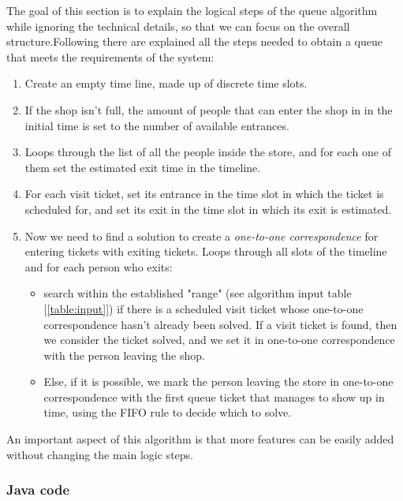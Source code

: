 The goal of this section is to explain the logical steps of the queue algorithm while ignoring the technical details, so that we can focus on the overall structure.\newline Following there are explained all the steps needed to obtain a queue that meets the requirements of the system:

\begin{enumerate}[topsep=0pt]
    \item Create an empty time line, made up of discrete time slots.
    \item If the shop isn't full, the amount of people that can enter the shop in in the initial time is set to the number of available entrances.
    \item Loops through the list of all the people inside the store, and for each one of them set the estimated exit time in the timeline.
    \item For each visit ticket, set its entrance in the time slot in which the ticket is scheduled for, and set its exit in the time slot in which its exit is estimated.
    \item Now we need to find a solution to create a \textit{one-to-one correspondence} for entering tickets with exiting tickets.\newline
          Loops through all slots of the timeline and for each person who exits:
          \begin{itemize}
              \item search within the established "range" (see algorithm input table [\ref{table:input}]) if there is a scheduled visit ticket whose one-to-one correspondence hasn't already been solved.\newline
              If a visit ticket is found, then we consider the ticket solved, and we set it in one-to-one correspondence with the person leaving the shop.
              \item Else, if it is possible, we mark the person leaving the store in one-to-one correspondence with the first queue ticket that manages to show up in time, using the FIFO rule to decide which to solve.
          \end{itemize}
\end{enumerate}

An important aspect of this algorithm is that more features can be easily added without changing the main logic steps.

\subsubsection{Java code}
\label{subsubsect:javacode}

